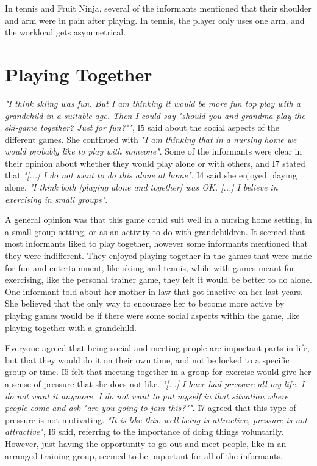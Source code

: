 In tennis and Fruit Ninja, several of the informants mentioned that their shoulder and arm were in pain after playing. In tennis, the player only uses one arm, and the workload gets asymmetrical.  
    
\section{Playing Together}
\emph{"I think skiing was fun. But I am thinking it would be more fun top play with a grandchild in a suitable age. Then I could say "should you and grandma play the ski-game together? Just for fun?""}, I5 said about the social aspects of the different games. She continued with \emph{"I am thinking that in a nursing home we would probably like to play with someone"}. Some of the informants were clear in their opinion about whether they would play alone or with others, and I7 stated that \emph{"[...] I do not want to do this alone at home"}. I4 said she  enjoyed playing alone, \emph{"I think both [playing alone and together] was OK. [...] I believe in  exercising in small groups"}.

A general opinion was that this game could suit well in a nursing home setting, in a small group setting, or as an activity to do with grandchildren. It seemed that most informants liked to play together, however some informants mentioned that they were indifferent. They enjoyed playing together in the games that were made for fun and entertainment, like skiing and tennis, while with games meant for exercising, like the personal trainer game, they felt it would be better to do alone. One informant told about her mother in law that got inactive on her last years. She believed that the only way to encourage her to become more active by playing games would be if there were some social aspects within the game, like playing together with a grandchild. 

Everyone agreed that being social and meeting people are important parts in life, but that they would do it on their own time, and not be locked to a specific group or time. I5 felt that meeting together in a group for exercise would give her a sense of pressure that she does not like. \emph{"[...] I have had pressure all my life. I do not want it anymore. I do not want to put myself in that situation where people come and ask "are you going to join this?""}. I7 agreed that this type of pressure is not motivating. \emph{"It is like this: well-being is attractive, pressure is not attractive"}, I6 said, referring to the importance of doing things voluntarily. However, just having the opportunity to go out and meet people, like in an arranged training group, seemed to be important for all of the informants. 

